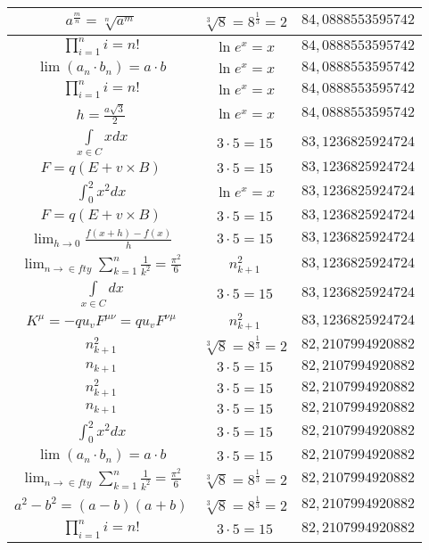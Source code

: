 \documentclass{article}
\begin{document}
\begin{flushleft}
\begin{longtable}{|c|c|c|}
$a^{\frac{m}{n}}=\sqrt[n]{a^{m}}$ & $\sqrt[3]{8}=8^{\frac{1}{3}}=2$ & $84,0888553595742$ \\ \hline 
$\prod_{i=1}^ni=n!$ & $\ln e^x=x$ & $84,0888553595742$ \\ \hline 
$\lim\left(a_n\cdot b_n\right)=a\cdot b$ & $\ln e^x=x$ & $84,0888553595742$ \\ \hline 
$\prod_{i=1}^ni=n!$ & $\ln e^x=x$ & $84,0888553595742$ \\ \hline 
$h=\frac{a\sqrt{3}}{2}$ & $\ln e^x=x$ & $84,0888553595742$ \\ \hline 
$\int \limits_{x\in C}xdx$ & $3\cdot 5=15$ & $83,1236825924724$ \\ \hline 
$F=q\left(E+v\times B\right)$ & $3\cdot 5=15$ & $83,1236825924724$ \\ \hline 
$\int _0^2x^2dx$ & $\ln e^x=x$ & $83,1236825924724$ \\ \hline 
$F=q\left(E+v\times B\right)$ & $3\cdot 5=15$ & $83,1236825924724$ \\ \hline 
$\lim_{h\to0}\frac{f(x+h)-f(x)}{h}$ & $3\cdot 5=15$ & $83,1236825924724$ \\ \hline 
$\lim_{n\to\in fty}\sum_{k=1}^n\frac{1}{k^2}=\frac{\pi^2}{6}$ & $n_{k+1}^2$ & $83,1236825924724$ \\ \hline 
$\int \limits_{x\in C}dx$ & $3\cdot 5=15$ & $83,1236825924724$ \\ \hline 
$K^\mu=-qu_vF^{\mu\nu}=qu_vF^{\nu\mu}$ & $n_{k+1}^2$ & $83,1236825924724$ \\ \hline 
$n_{k+1}^2$ & $\sqrt[3]{8}=8^{\frac{1}{3}}=2$ & $82,2107994920882$ \\ \hline 
$n_{k+1}$ & $3\cdot 5=15$ & $82,2107994920882$ \\ \hline 
$n_{k+1}^2$ & $3\cdot 5=15$ & $82,2107994920882$ \\ \hline 
$n_{k+1}$ & $3\cdot 5=15$ & $82,2107994920882$ \\ \hline 
$\int _0^2x^2dx$ & $3\cdot 5=15$ & $82,2107994920882$ \\ \hline 
$\lim\left(a_n\cdot b_n\right)=a\cdot b$ & $3\cdot 5=15$ & $82,2107994920882$ \\ \hline 
$\lim_{n\to\in fty}\sum_{k=1}^n\frac{1}{k^2}=\frac{\pi^2}{6}$ & $\sqrt[3]{8}=8^{\frac{1}{3}}=2$ & $82,2107994920882$ \\ \hline 
$a^2-b^2=(a-b)(a+b)$ & $\sqrt[3]{8}=8^{\frac{1}{3}}=2$ & $82,2107994920882$ \\ \hline 
$\prod_{i=1}^ni=n!$ & $3\cdot 5=15$ & $82,2107994920882$ \\ \hline 

\end{longtable}
\end{flushleft}
\end{document}
